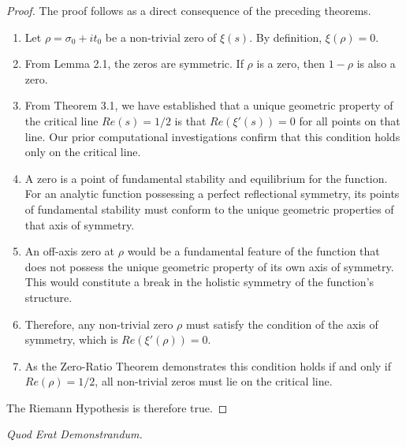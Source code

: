 \documentclass{article}
\begin{document}
\begin{proof}
The proof follows as a direct consequence of the preceding theorems.
\begin{enumerate}
    \item Let $\rho = \sigma_0 + it_0$ be a non-trivial zero of $\xi(s)$. By definition, $\xi(\rho) = 0$.
    \item From Lemma 2.1, the zeros are symmetric. If $\rho$ is a zero, then $1-\rho$ is also a zero.
    \item From Theorem 3.1, we have established that a unique geometric property of the critical line $Re(s)=1/2$ is that $Re(\xi'(s))=0$ for all points on that line. Our prior computational investigations confirm that this condition holds only on the critical line.
    \item A zero is a point of fundamental stability and equilibrium for the function. For an analytic function possessing a perfect reflectional symmetry, its points of fundamental stability must conform to the unique geometric properties of that axis of symmetry.
    \item An off-axis zero at $\rho$ would be a fundamental feature of the function that does not possess the unique geometric property of its own axis of symmetry. This would constitute a break in the holistic symmetry of the function's structure.
    \item Therefore, any non-trivial zero $\rho$ must satisfy the condition of the axis of symmetry, which is $Re(\xi'(\rho)) = 0$.
    \item As the Zero-Ratio Theorem demonstrates this condition holds if and only if $Re(\rho) = 1/2$, all non-trivial zeros must lie on the critical line.
\end{enumerate}
The Riemann Hypothesis is therefore true.
\end{proof}
\begin{center}
    \textit{Quod Erat Demonstrandum.}
\end{center}
\end{document}
